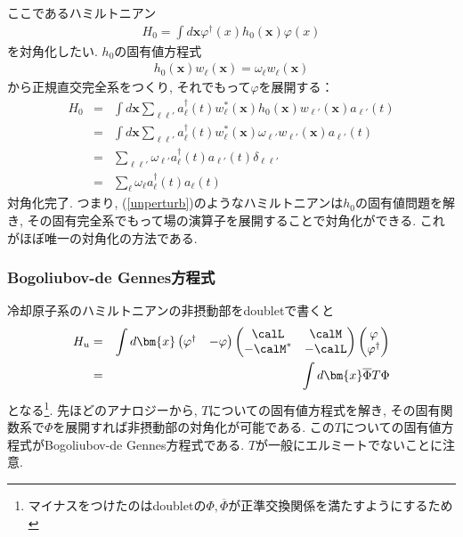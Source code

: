 ここであるハミルトニアン
\begin{eqnarray}
  H_0 = \int d\bm{x} \varphi^\dagger(x)h_0(\bm{x})\varphi(x)\label{unperturb}
\end{eqnarray}
を対角化したい. $h_0$の固有値方程式
\begin{eqnarray}
  h_0(\bm{x})w_\ell(\bm{x}) = \omega_\ell w_\ell(\bm{x})
\end{eqnarray}
から正規直交完全系をつくり, それでもって$\varphi$を展開する：
\begin{eqnarray}
  H_0 &=& \int d\bm{x} \sum_{\ell\ell'}a^\dagger_\ell(t)w^*_\ell(\bm{x})h_0(\bm{x})w_{\ell'}(\bm{x})a_{\ell'}(t)\\
  &=& \int d\bm{x} \sum_{\ell\ell'}a^\dagger_\ell(t)w^*_\ell(\bm{x})\omega_{\ell'}w_{\ell'}(\bm{x})a_{\ell'}(t)\\
  &=& \sum_{\ell\ell'}\omega_{\ell'}a^\dagger_\ell(t)a_{\ell'}(t)\delta_{\ell\ell'}\\
  &=& \sum_{\ell}\omega_{\ell}a^\dagger_\ell(t)a_{\ell}(t)
\end{eqnarray}
対角化完了. つまり, (\ref{unperturb})のようなハミルトニアンは$h_0$の固有値問題を解き, その固有完全系でもって場の演算子を展開することで対角化ができる. これがほぼ唯一の対角化の方法である.
\subsubsection{Bogoliubov-de Gennes方程式}
冷却原子系のハミルトニアンの非摂動部をdoubletで書くと
\begin{eqnarray}
  H_u &=&  \int d\bm{x}
  \begin{pmatrix}
    \varphi^\dagger&-\varphi 
  \end{pmatrix}
  \begin{pmatrix}
    \calL &\calM\\
    -\calM^* &-\calL
  \end{pmatrix}
  \begin{pmatrix}
    \varphi\\
    \varphi^\dagger 
  \end{pmatrix}\\
  &=& \int d\bm{x} \overline{\Phi}T\Phi
\end{eqnarray}
となる\footnote{マイナスをつけたのはdoubletの$\Phi, \overline{\Phi}$が正準交換関係を満たすようにするため}. 先ほどのアナロジーから, $T$についての固有値方程式を解き, その固有関数系で$\Phi$を展開すれば非摂動部の対角化が可能である. この$T$についての固有値方程式がBogoliubov-de Gennes方程式である. $T$が一般にエルミートでないことに注意.
